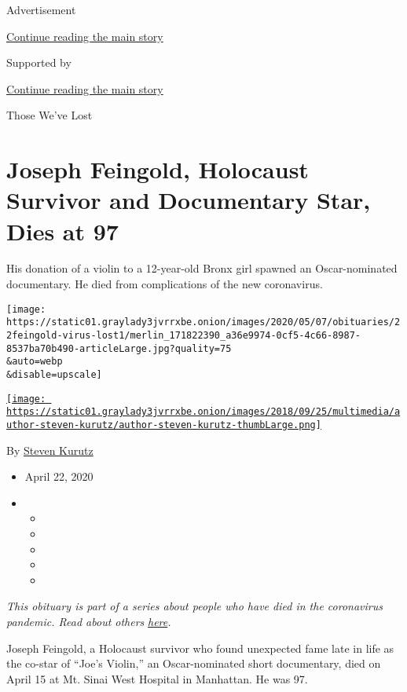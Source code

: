 Advertisement

\protect\hyperlink{after-top}{Continue reading the main story}

Supported by

\protect\hyperlink{after-sponsor}{Continue reading the main story}

Those We've Lost

\hypertarget{joseph-feingold-holocaust-survivor-and-documentary-star-dies-at-97}{%
\section{Joseph Feingold, Holocaust Survivor and Documentary Star, Dies
at
97}\label{joseph-feingold-holocaust-survivor-and-documentary-star-dies-at-97}}

His donation of a violin to a 12-year-old Bronx girl spawned an
Oscar-nominated documentary. He died from complications of the new
coronavirus.

\texttt{[image: https://static01.graylady3jvrrxbe.onion/images/2020/05/07/obituaries/22feingold-virus-lost1/merlin\_171822390\_a36e9974-0cf5-4c66-8987-8537ba70b490-articleLarge.jpg?quality=75\\\&auto=webp\\\&disable=upscale]}

\href{https://www.nytimes3xbfgragh.onion/by/steven-kurutz}{\texttt{[image: https://static01.graylady3jvrrxbe.onion/images/2018/09/25/multimedia/author-steven-kurutz/author-steven-kurutz-thumbLarge.png]}}

By \href{https://www.nytimes3xbfgragh.onion/by/steven-kurutz}{Steven
Kurutz}

\begin{itemize}
\item
  April 22, 2020
\item
  \begin{itemize}
  \item
  \item
  \item
  \item
  \item
  \end{itemize}
\end{itemize}

\emph{This obituary is part of a series about people who have died in
the coronavirus pandemic. Read about others}
\href{https://www.nytimes3xbfgragh.onion/series/people-who-have-died-of-the-coronavirus}{\emph{here}}\emph{.}

Joseph Feingold, a Holocaust survivor who found unexpected fame late in
life as the co-star of ``Joe's Violin,'' an Oscar-nominated short
documentary, died on April 15 at Mt. Sinai West Hospital in Manhattan.
He was 97.

